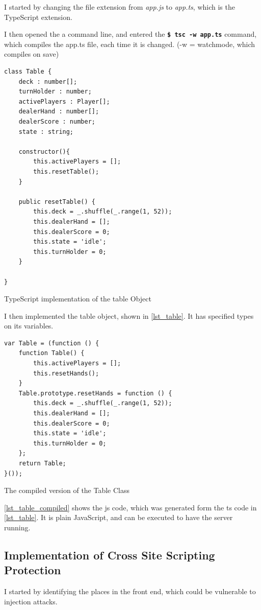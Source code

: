 \documentclass[a4paper]{article}
\begin{document}
I started by changing the file extension from \textit{app.js} to \textit{app.ts}, which is the TypeScript extension.

I then opened the a command line, and entered the \textbf{\texttt{\$ tsc -w app.ts}} command, which compiles the app.ts file, each time it is changed. (-w = watchmode, which compiles on save)

\begin{listing}[H]
\begin{verbatim}
class Table {
    deck : number[];
    turnHolder : number;
    activePlayers : Player[];
    dealerHand : number[];
    dealerScore : number;
    state : string;

    constructor(){
        this.activePlayers = [];
        this.resetTable();
    }

    public resetTable() {
        this.deck = _.shuffle(_.range(1, 52));
        this.dealerHand = [];
        this.dealerScore = 0;
        this.state = 'idle';
        this.turnHolder = 0;
    }
    
}
\end{verbatim}
\caption{TypeScript implementation of the table Object}
\label{lst_table}
\end{listing}

I then implemented the table object, shown in \autoref{lst_table}. It has specified types on its variables.

\begin{listing}[H]
\begin{verbatim}
var Table = (function () {
    function Table() {
        this.activePlayers = [];
        this.resetHands();
    }
    Table.prototype.resetHands = function () {
        this.deck = _.shuffle(_.range(1, 52));
        this.dealerHand = [];
        this.dealerScore = 0;
        this.state = 'idle';
        this.turnHolder = 0;
    };
    return Table;
}());
\end{verbatim}
\caption{The compiled version of the Table Class}
\label{lst_table_compiled}
\end{listing}


\autoref{lst_table_compiled} shows the js code, which was generated form the ts code in \autoref{lst_table}. It is plain JavaScript, and can be executed to have the server running.


\subsection{Implementation of Cross Site Scripting Protection}
I started by identifying the places in the front end, which could be vulnerable to injection attacks.
\end{document}
